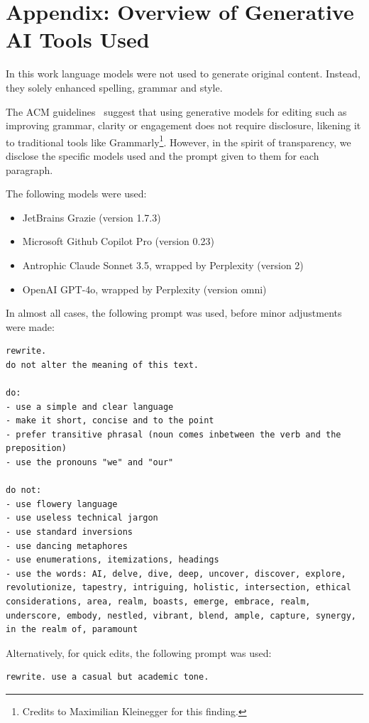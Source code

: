 \documentclass[a4paper, oneside]{discothesis}
\begin{document}
\bigskip



\appendix

\chapter*{Appendix: Overview of Generative AI Tools Used}

In this work language models were not used to generate original content. Instead, they solely enhanced spelling, grammar and style.

The ACM guidelines~\cite{acm_authorship_2024} suggest that using generative models for editing \textendash{} such as improving grammar, clarity or engagement \textendash{} does not require disclosure, likening it to traditional tools like Grammarly\footnote{Credits to Maximilian Kleinegger for this finding.}. However, in the spirit of transparency, we disclose the specific models used and the prompt given to them for each paragraph.

The following models were used:

\begin{itemize}
	\item JetBrains Grazie (version 1.7.3)
	\item Microsoft Github Copilot Pro (version 0.23)
	\item Antrophic Claude Sonnet 3.5, wrapped by Perplexity (version 2)
	\item OpenAI GPT-4o, wrapped by Perplexity (version omni)
\end{itemize}

In almost all cases, the following prompt was used, before minor adjustments were made:

\begin{verbatim}
rewrite.
do not alter the meaning of this text.

do:
- use a simple and clear language
- make it short, concise and to the point
- prefer transitive phrasal (noun comes inbetween the verb and the preposition)
- use the pronouns "we" and "our"

do not:
- use flowery language
- use useless technical jargon
- use standard inversions
- use dancing metaphores
- use enumerations, itemizations, headings
- use the words: AI, delve, dive, deep, uncover, discover, explore, revolutionize, tapestry, intriguing, holistic, intersection, ethical considerations, area, realm, boasts, emerge, embrace, realm, underscore, embody, nestled, vibrant, blend, ample, capture, synergy, in the realm of, paramount
\end{verbatim}

Alternatively, for quick edits, the following prompt was used:

\begin{verbatim}
rewrite. use a casual but academic tone.
\end{verbatim}
\end{document}
